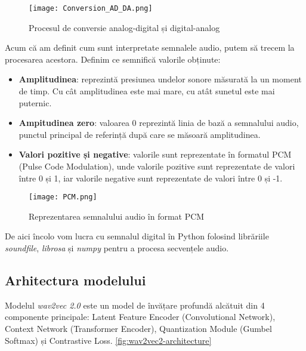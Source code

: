 \begin{figure}[h]
    \centering
    \texttt{[image: Conversion\_AD\_DA.png]}
    \caption{Procesul de conversie analog-digital și digital-analog\protect\footnotemark[1]}
    \label{fig:conversion-ad-da}
\end{figure}

\par
Acum că am definit cum sunt interpretate semnalele audio, putem să trecem la procesarea acestora.
Definim ce semnifică valorile obținute:

\begin{itemize}
    \item \textbf{Amplitudinea}: reprezintă presiunea undelor sonore măsurată la un moment de timp.
    Cu cât amplitudinea este mai mare, cu atât sunetul este mai puternic.
    \item \textbf{Ampitudinea zero}: valoarea 0 reprezintă linia de bază a semnalului audio, punctul
    principal de referință după care se măsoară amplitudinea.
    \item \textbf{Valori pozitive și negative}: valorile sunt reprezentate în formatul PCM (Pulse Code Modulation),
    unde valorile pozitive sunt reprezentate de valori între 0 și 1, iar valorile negative sunt reprezentate
    de valori între 0 și -1.
\end{itemize}

\begin{figure}[h]
    \centering
    \texttt{[image: PCM.png]}
    \caption{Reprezentarea semnalului audio în format PCM\protect\footnotemark[1]}
    \label{fig:pcm}
\end{figure}

\par
De aici încolo vom lucra cu semnalul digital în Python folosind librăriile \textit{soundfile},
\textit{librosa} și \textit{numpy} pentru a procesa secvențele audio.

\subsection{Arhitectura modelului}
\vspace{1em}
Modelul \textit{wav2vec 2.0} este un model de învățare profundă alcătuit din 4
componente principale: Latent Feature Encoder (Convolutional Network), Context 
Network (Transformer Encoder), Quantization Module (Gumbel Softmax) și 
Contrastive Loss. \ref{fig:wav2vec2-architecture}

